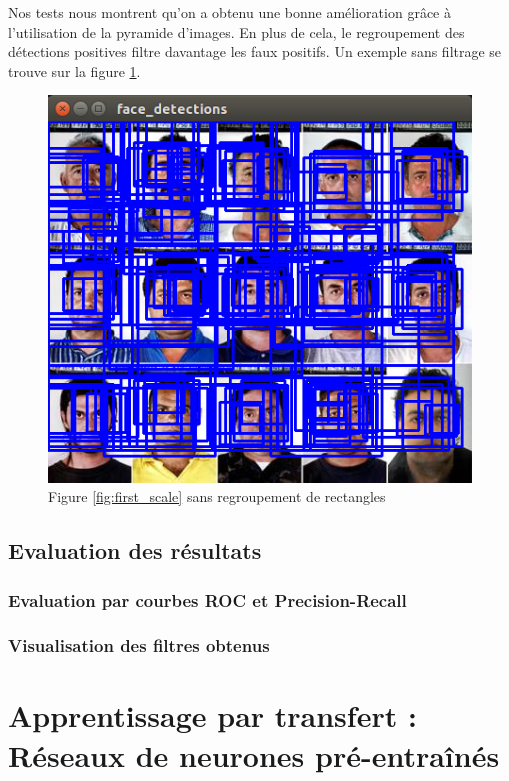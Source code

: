 \documentclass[a4paper,11pt]{article}
\begin{document}
    Nos tests nous montrent qu'on a obtenu une bonne amélioration grâce à l'utilisation de la pyramide d'images.
    En plus de cela, le regroupement des détections positives filtre davantage les faux positifs.
    Un exemple sans filtrage se trouve sur la figure \ref{fig:without_filter}.

	\begin{figure}[H]
	    \centering
	    \includegraphics[scale=0.3]{without_filter.png}
	    \caption{Figure \ref{fig:first_scale} sans regroupement de rectangles}
	    \label{fig:without_filter}
	\end{figure}



\subsection{Evaluation des résultats}
\subsubsection{Evaluation par courbes ROC et Precision-Recall}
\subsubsection{Visualisation des filtres obtenus}

\section{Apprentissage par transfert : Réseaux de neurones pré-entraînés}
\end{document}

